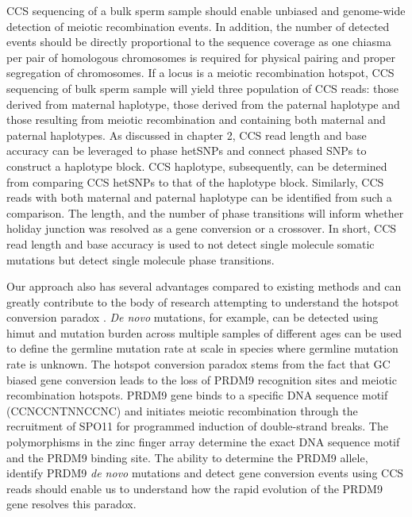 CCS sequencing of a bulk sperm sample should enable unbiased and genome-wide detection of meiotic recombination events. In addition, the number of detected events should be directly proportional to the sequence coverage as one chiasma per pair of homologous chromosomes is required for physical pairing and proper segregation of chromosomes. If a locus is a meiotic recombination hotspot, CCS sequencing of bulk sperm sample will yield three population of CCS reads: those derived from maternal haplotype, those derived from the paternal haplotype and those resulting from meiotic recombination and containing both maternal and paternal haplotypes. As discussed in chapter 2, CCS read length and base accuracy can be leveraged to phase hetSNPs and connect phased SNPs to construct a haplotype block. CCS haplotype, subsequently, can be determined from comparing CCS hetSNPs to that of the haplotype block. Similarly, CCS reads with both maternal and paternal haplotype can be identified from such a comparison. The length, and the number of phase transitions will inform whether holiday junction was resolved as a gene conversion or a crossover. In short, CCS read length and base accuracy is used to not detect single molecule somatic mutations but detect single molecule phase transitions.

Our approach also has several advantages compared to existing methods and can greatly contribute to the body of research attempting to understand the hotspot conversion paradox \cite{}. \textit{De novo} mutations, for example, can be detected using himut and mutation burden across multiple samples of different ages can be used to define the germline mutation rate at scale in species where germline mutation rate is unknown. The hotspot conversion paradox stems from the fact that GC biased gene conversion leads to the loss of PRDM9 recognition sites and meiotic recombination hotspots. PRDM9 gene binds to a specific DNA sequence motif (CCNCCNTNNCCNC) \cite{} and initiates meiotic recombination through the recruitment of SPO11 for programmed induction of double-strand breaks. The polymorphisms in the zinc finger array determine the exact DNA sequence motif and the PRDM9 binding site. The ability to determine the PRDM9 allele, identify PRDM9 \textit{de novo} mutations and detect gene conversion events using CCS reads should enable us to understand how the rapid evolution of the PRDM9 gene resolves this paradox. 

